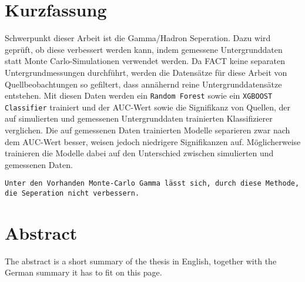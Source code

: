 \thispagestyle{plain}

\section*{Kurzfassung}
Schwerpunkt dieser Arbeit ist die Gamma/Hadron Seperation. 
Dazu wird geprüft, ob diese verbessert werden kann, indem gemessene Untergrunddaten statt Monte Carlo-Simulationen verwendet werden.
Da FACT keine separaten Untergrundmessungen durchführt, werden die Datensätze für diese Arbeit von Quellbeobachtungen so gefiltert, dass annähernd reine Untergrunddatensätze entstehen.
Mit diesen Daten werden ein \texttt{Random Forest} sowie ein \texttt{XGBOOST Classifier} trainiert und der AUC-Wert sowie die Signifikanz von Quellen, der auf simulierten und gemessenen Untergrunddaten trainierten Klassifizierer verglichen. 
Die auf gemessenen Daten trainierten Modelle separieren zwar nach dem AUC-Wert besser, weisen jedoch niedrigere Signifikanzen auf. 
Möglicherweise trainieren die Modelle dabei auf den Unterschied zwischen simulierten und gemessenen Daten. 

\texttt{Unter den Vorhanden Monte-Carlo Gamma lässt sich, durch diese Methode, die Seperation nicht verbessern.}
\section*{Abstract}
\begin{english}
The abstract is a short summary of the thesis in English, together with the German summary it has to fit on this page.
\end{english}
